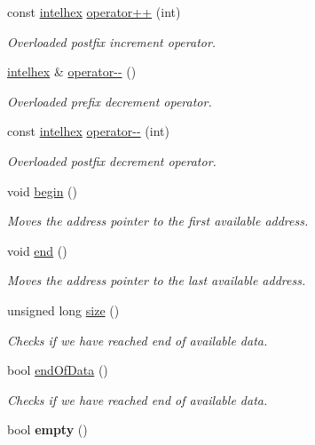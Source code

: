 \begin{DoxyCompactItemize}
const \hyperlink{classintelhex}{intelhex} \hyperlink{classintelhex_ab54337b9681fc0b50e3fdb18ed1714fa}{operator++} (int)
\begin{DoxyCompactList}\small\item\em Overloaded postfix increment operator. \end{DoxyCompactList}\item 
\hyperlink{classintelhex}{intelhex} \& \hyperlink{classintelhex_ab85cbeafe9cc6adcec79f1bc709addca}{operator-\/-\/} ()
\begin{DoxyCompactList}\small\item\em Overloaded prefix decrement operator. \end{DoxyCompactList}\item 
const \hyperlink{classintelhex}{intelhex} \hyperlink{classintelhex_a90562846d95b5573923f129b82aeceec}{operator-\/-\/} (int)
\begin{DoxyCompactList}\small\item\em Overloaded postfix decrement operator. \end{DoxyCompactList}\item 
void \hyperlink{classintelhex_ab2b1119e14a960ea2b356967244aafb3}{begin} ()
\begin{DoxyCompactList}\small\item\em Moves the address pointer to the first available address. \end{DoxyCompactList}\item 
void \hyperlink{classintelhex_a7759926596cfcffec94e391fff4298e9}{end} ()
\begin{DoxyCompactList}\small\item\em Moves the address pointer to the last available address. \end{DoxyCompactList}\item 
unsigned long \hyperlink{classintelhex_afa757932ec420f977d33bb9a2d5a0a69}{size} ()
\begin{DoxyCompactList}\small\item\em Checks if we have reached end of available data. \end{DoxyCompactList}\item 
bool \hyperlink{classintelhex_aff915b320f5a4c2d84340fa57c99499c}{end\-Of\-Data} ()
\begin{DoxyCompactList}\small\item\em Checks if we have reached end of available data. \end{DoxyCompactList}\item 
\hypertarget{classintelhex_a2bd5b567207303d4d9f4322e6262d6d6}{bool {\bfseries empty} ()}\label{classintelhex_a2bd5b567207303d4d9f4322e6262d6d6}


\end{DoxyCompactItemize}
